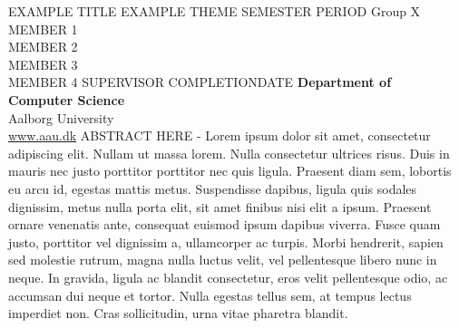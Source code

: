 \aautitlepage
    {EXAMPLE TITLE}     %
    {EXAMPLE THEME}     %
    {SEMESTER PERIOD}   %
    {Group X}           %
    {MEMBER 1\\         %
    MEMBER 2\\
    MEMBER 3\\
    MEMBER 4}
    {SUPERVISOR}        %
    {COMPLETIONDATE}    %
    {\textbf{Department of\\ 
    Computer Science}\\
    Aalborg University\\
    \href{https://www.aau.dk}{www.aau.dk}}
    {ABSTRACT HERE - Lorem ipsum dolor sit amet, consectetur adipiscing elit. Nullam ut massa lorem. Nulla consectetur ultrices risus. Duis in mauris nec justo porttitor porttitor nec quis ligula. Praesent diam sem, lobortis eu arcu id, egestas mattis metus. Suspendisse dapibus, ligula quis sodales dignissim, metus nulla porta elit, sit amet finibus nisi elit a ipsum. Praesent ornare venenatis ante, consequat euismod ipsum dapibus viverra. Fusce quam justo, porttitor vel dignissim a, ullamcorper ac turpis. Morbi hendrerit, sapien sed molestie rutrum, magna nulla luctus velit, vel pellentesque libero nunc in neque. In gravida, ligula ac blandit consectetur, eros velit pellentesque odio, ac accumsan dui neque et tortor. Nulla egestas tellus sem, at tempus lectus imperdiet non. Cras sollicitudin, urna vitae pharetra blandit.}